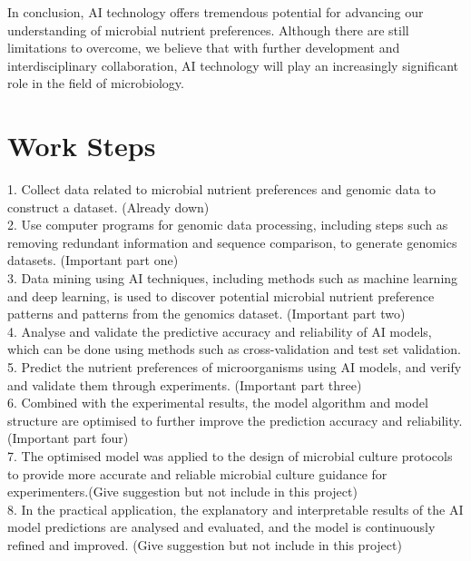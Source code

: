 \documentclass{article}
\begin{document}
In conclusion, AI technology offers tremendous potential for advancing our understanding of microbial nutrient preferences. Although there are still limitations to overcome, we believe that with further development and interdisciplinary collaboration, AI technology will play an increasingly significant role in the field of microbiology.


\section{Work Steps}

1.	Collect data related to microbial nutrient preferences and genomic data to construct a dataset. (Already down)\\

2.	Use computer programs for genomic data processing, including steps such as removing redundant information and sequence comparison, to generate genomics datasets. (Important part one)\\

3.	Data mining using AI techniques, including methods such as machine learning and deep learning, is used to discover potential microbial nutrient preference patterns and patterns from the genomics dataset. (Important part two)\\

4.	Analyse and validate the predictive accuracy and reliability of AI models, which can be done using methods such as cross-validation and test set validation.\\

5.	Predict the nutrient preferences of microorganisms using AI models, and verify and validate them through experiments. (Important part three)\\

6.	Combined with the experimental results, the model algorithm and model structure are optimised to further improve the prediction accuracy and reliability. (Important part four)\\

7.	The optimised model was applied to the design of microbial culture protocols to provide more accurate and reliable microbial culture guidance for experimenters.(Give suggestion but not include in this project)\\

8.	In the practical application, the explanatory and interpretable results of the AI model predictions are analysed and evaluated, and the model is continuously refined and improved. (Give suggestion but not include in this project)
\end{document}
